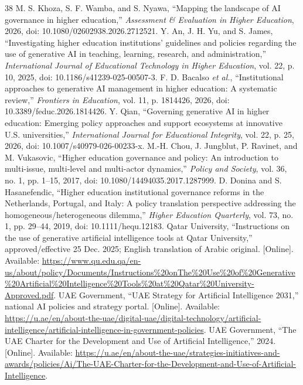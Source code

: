 \documentclass[conference,letterpaper]{IEEEtran}
\begin{document}
\begin{thebibliography}{38}
 M. S. Khoza, S. F. Wamba, and S. Nyawa, ``Mapping the landscape of AI governance in higher education,'' \emph{Assessment \& Evaluation in Higher Education}, 2026, doi: 10.1080/02602938.2026.2712521.
 Y. An, J. H. Yu, and S. James, ``Investigating higher education institutions' guidelines and policies regarding the use of generative AI in teaching, learning, research, and administration,'' \emph{International Journal of Educational Technology in Higher Education}, vol. 22, p. 10, 2025, doi: 10.1186/s41239-025-00507-3.
 F. D. Bacalso \emph{et al.}, ``Institutional approaches to generative AI management in higher education: A systematic review,'' \emph{Frontiers in Education}, vol. 11, p. 1814426, 2026, doi: 10.3389/feduc.2026.1814426.
 Y. Qian, ``Governing generative AI in higher education: Emerging policy approaches and support ecosystems at innovative U.S. universities,'' \emph{International Journal for Educational Integrity}, vol. 22, p. 25, 2026, doi: 10.1007/s40979-026-00233-x.
 M.-H. Chou, J. Jungblut, P. Ravinet, and M. Vukasovic, ``Higher education governance and policy: An introduction to multi-issue, multi-level and multi-actor dynamics,'' \emph{Policy and Society}, vol. 36, no. 1, pp. 1--15, 2017, doi: 10.1080/14494035.2017.1287999.
 D. Donina and S. Hasanefendic, ``Higher education institutional governance reforms in the Netherlands, Portugal, and Italy: A policy translation perspective addressing the homogeneous/heterogeneous dilemma,'' \emph{Higher Education Quarterly}, vol. 73, no. 1, pp. 29--44, 2019, doi: 10.1111/hequ.12183.
 Qatar University, ``Instructions on the use of generative artificial intelligence tools at Qatar University,'' approved/effective 25 Dec. 2025; English translation of Arabic original. [Online]. Available: \url{https://www.qu.edu.qa/en-us/about/policy/Documents/Instructions%20onThe%20Use%20of%20Generative%20Artificial%20Intelligence%20Tools%20at%20Qatar%20University-Approved.pdf}.
 UAE Government, ``UAE Strategy for Artificial Intelligence 2031,'' national AI policies and strategy portal. [Online]. Available: \url{https://u.ae/en/about-the-uae/digital-uae/digital-technology/artificial-intelligence/artificial-intelligence-in-government-policies}.
 UAE Government, ``The UAE Charter for the Development and Use of Artificial Intelligence,'' 2024. [Online]. Available: \url{https://u.ae/en/about-the-uae/strategies-initiatives-and-awards/policies/Ai/The-UAE-Charter-for-the-Development-and-Use-of-Artificial-Intelligence}.

\end{thebibliography}
\end{document}
